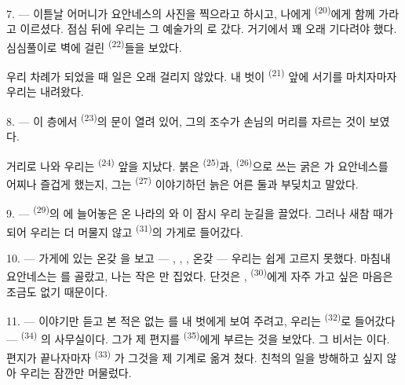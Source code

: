 \VUsaut{3.0mm}

7. --- 이튿날 어머니가 요안네스의 사진을 찍으라고 하시고, 나에게 
\textsuperscript{(20)}에게 함께 가라고 이르셨다. 점심 뒤에 우리는 그 예술가의
로 갔다. 거기에서 꽤 오래 기다려야 했다. 심심풀이로 벽에 걸린
 \textsuperscript{(22)}들을 보았다.

우리 차례가 되었을 때 일은 오래 걸리지 않았다. 내 벗이  \textsuperscript{(21)}
앞에 서기를 마치자마자 우리는 내려왔다.

8. --- 이 층에서  \textsuperscript{(23)}의 문이 열려 있어, 그의 조수가
손님의 머리를 자르는 것이 보였다.

거리로 나와 우리는  \textsuperscript{(24)} 앞을 지났다. 붉은
 \textsuperscript{(25)}과,  \textsuperscript{(26)}으로 쓰는 굵은
가 요안네스를 어찌나 즐겁게 했는지, 그는 
\textsuperscript{(27)} 이야기하던 늙은 어른 둘과 부딪치고 말았다.

\VUsaut{3.0mm}

9. ---  \textsuperscript{(29)}의 에 늘어놓은 온 나라의
와 이 잠시 우리 눈길을 끌었다. 그러나 새참 때가 되어 우리는
더 머물지 않고  \textsuperscript{(31)}의 가게로 들어갔다.

10. --- 가게에 있는 온갖 을 보고 — , ,
, 온갖  — 우리는 쉽게 고르지 못했다. 마침내 요안네스는
를 골랐고, 나는 작은 만 집었다. 단것은
,  \textsuperscript{(30)}에게 자주 가고 싶은
마음은 조금도 없기 때문이다.

\VUsaut{3.0mm}

11. --- 이야기만 듣고 본 적은 없는 를 내 벗에게 보여 주려고, 우리는
 \textsuperscript{(32)}로 들어갔다 —  \textsuperscript{(34)}
의 사무실이다. 그가 제 편지를  \textsuperscript{(35)}에게 부르는 것을 보았다.
그 비서는 이다. 편지가 끝나자마자  \textsuperscript{(33)}
가 그것을 제 기계로 옮겨 쳤다. 친척의 일을 방해하고 싶지 않아 우리는 잠깐만 머물렀다.

